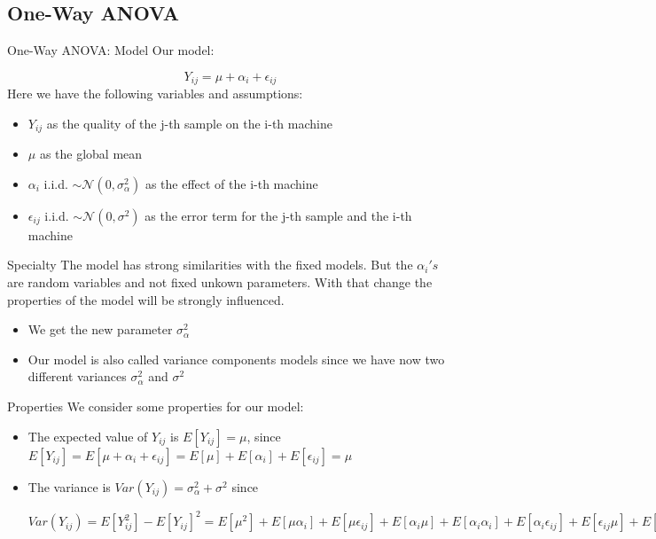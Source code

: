 \documentclass[unknownkeysallowed]{beamer}
\begin{document}
\subsection{One-Way ANOVA}
\begin{frame}{One-Way ANOVA: Model}
Our model:

$$
Y_{ij} = \mu + \alpha_i + \epsilon_{ij}
$$
Here we have the following variables and assumptions:
\begin{itemize}
    \item $Y_{ij}$ as the quality of the j-th sample on the i-th machine 
    \item $\mu$ as the global mean
    \item $\alpha_i$ i.i.d.  
    $\sim \mathcal{N}(0,\sigma^2_{\alpha})$ as the effect of the i-th machine
    \item $\epsilon_{ij}$ i.i.d. $\sim \mathcal{N}(0,\sigma^2)$ as the error term for the j-th sample and the i-th machine
\end{itemize}
\end{frame}

\begin{frame}{Specialty}
    The model has strong similarities with the fixed models. But the $\alpha_i's$ are random variables and not fixed unkown parameters.
    With that change the properties of the model will be strongly influenced.
    \begin{itemize}
        \item We get the new parameter $\sigma^2_{\alpha}$
        \item Our model is also called variance components models since we have now two different variances $\sigma^2_{\alpha}$ and $\sigma^2$
    \end{itemize}
\end{frame}

\begin{frame}{Properties}
    We consider some properties for our model:
    \begin{itemize}
        \item The expected value of $Y_{ij}$ is $E[Y_{ij}]=\mu$, since $E[Y_{ij}] = E[\mu + \alpha_i + \epsilon_{ij}] = E[\mu] + E[\alpha_i] + E[\epsilon_{ij}] = \mu$
        \item The variance is $Var(Y_{ij}) = \sigma^2_{\alpha} +\sigma^2$ since
        
        $Var(Y_{ij}) = E[Y_{ij}^2] - E[Y_{ij}]^2
        = E[\mu^2] + E[\mu \alpha_i] + E[\mu \epsilon_{ij}] + E[\alpha_i \mu] + E[\alpha_i \alpha_i] + E[\alpha_i \epsilon_{ij}] + E[\epsilon_{ij} \mu] + E[\epsilon_{ij}\alpha_i] + E[\epsilon_{ij}\epsilon_{ij}] - \mu^2
        = \mu^2 + \mu \underbrace{E[\alpha_i]}_\text{= 0} + \mu \underbrace{E[\epsilon_{ij}]}_\text{= 0} + \underbrace{E[\alpha_i]}_\text{=0}\mu + E[\alpha_i^2] + \underbrace{E[\alpha_i]}_\text{= 0}\underbrace{E[\epsilon_{ij}]}_\text{= 0} + \underbrace{E[\epsilon_{ij}]}_\text{=0}\mu + \underbrace{E[\epsilon_{ij}]}_\text{=0} \underbrace{E[\alpha_i]}_\text{=0} + E[\epsilon_{ij}^2] - \mu^2 
        = E[\alpha_i^2] + E[\epsilon_{ij}^2]
        = \sigma^2_{\alpha} + \sigma^2$
    \end{itemize}
\end{frame}
\end{document}
